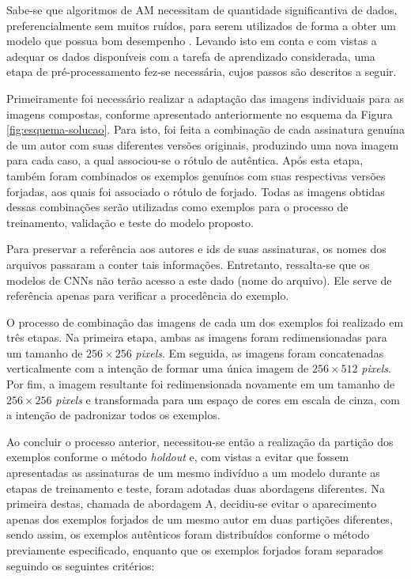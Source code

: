 
Sabe-se que algoritmos de AM necessitam de quantidade significantiva de dados, preferencialmente sem muitos ruídos, para serem utilizados de forma a obter um modelo que possua bom desempenho \cite{marsland}. Levando isto em conta e com vistas a adequar os dados disponíveis com a tarefa de aprendizado considerada, uma etapa de pré-processamento fez-se necessária, cujos passos são descritos a seguir.

Primeiramente foi necessário realizar a adaptação das imagens individuais para as imagens compostas, conforme apresentado anteriormente no esquema da Figura \ref{fig:esquema-solucao}. Para isto, foi feita a combinação de cada assinatura genuína de um autor com suas diferentes versões originais, produzindo uma nova imagem para cada caso, a qual associou-se o rótulo de autêntica. Após esta etapa, também foram combinados os exemplos genuínos com suas respectivas versões forjadas, aos quais foi associado o rótulo de forjado. Todas as imagens obtidas dessas combinações serão utilizadas como exemplos para o processo de treinamento, validação e teste do modelo proposto.

Para preservar a referência aos autores e ids de suas assinaturas, os nomes dos arquivos passaram a conter tais informações. Entretanto, ressalta-se que os modelos de CNNs não terão acesso a este dado (nome do arquivo). Ele serve de referência apenas para verificar a procedência do exemplo.

O processo de combinação das imagens de cada um dos exemplos foi realizado em três etapas. Na primeira etapa, ambas as imagens foram redimensionadas para um tamanho de $256 \times 256$ \emph{pixels}. Em seguida, as imagens foram concatenadas verticalmente com a intenção de formar uma única imagem de $256 \times 512$ \emph{pixels}. Por fim, a imagem resultante foi redimensionada novamente em um tamanho de $256 \times 256$ \emph{pixels} e transformada para um espaço de cores em escala de cinza, com a intenção de padronizar todos os exemplos.

Ao concluir o processo anterior, necessitou-se então a realização da partição dos exemplos conforme o método \emph{holdout} e, com vistas a evitar que fossem apresentadas as assinaturas de um mesmo indivíduo a um modelo durante as etapas de treinamento e teste, foram adotadas duas abordagens diferentes. Na primeira destas, chamada de abordagem A, decidiu-se evitar o aparecimento apenas dos exemplos forjados de um mesmo autor em duas partições diferentes, sendo assim, os exemplos autênticos foram distribuídos conforme o método previamente especificado, enquanto que os exemplos forjados foram separados seguindo os seguintes critérios:

